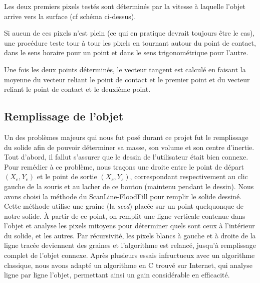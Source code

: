 Les deux premiers pixels testés sont déterminés par la vitesse à laquelle
l'objet arrive vers la surface (cf schéma ci-dessus).

Si aucun de ces pixels n'est plein (ce qui en pratique devrait toujours être le cas),
une procédure teste tour à tour les pixels en tournant autour du point de contact,
dans le sens horaire pour un point et dans le sens trigonométrique pour l'autre.

Une fois les deux points déterminés, le vecteur tangent est calculé en
faisant la moyenne du vecteur reliant le point de contact et le premier point
et du vecteur reliant le point de contact et le deuxième point.



\subsection{Remplissage de l'objet}
Un des problèmes majeurs qui nous fut posé durant ce projet fut le remplissage
du solide afin de pouvoir déterminer sa masse, son volume et son centre d'inertie.
Tout d'abord, il fallut s'assurer que le dessin de l'utilisateur était bien connexe.
Pour remédier à ce problème, nous traçons une droite entre le point de départ
$(X_e,Y_e)$ et le point de sortie $(X_s,Y_s)$, correspondant respectivement au clic
gauche de la souris et au lacher de ce bouton (maintenu pendant le dessin).
Nous avons choisi la méthode du ScanLine-FloodFill pour remplir le solide dessiné.
Cette méthode utilise une graine (la \emph{seed}) placée sur un point quelquonque
de notre solide. À partir de ce point, on remplit une ligne verticale contenue dans l'objet
et analyse les pixels mitoyens pour déterminer
quels sont ceux à l'intérieur du solide, et les autres. Par récursivité, les pixels
blancs à gauche et à droite de la ligne tracée deviennent des graines et l'algorithme
est relancé, jusqu'à remplissage complet de l'objet connexe.
Après plusieurs essais infructueux avec un algorithme classique, nous avons
adapté un algorithme en C trouvé sur Internet, qui analyse ligne par ligne l'objet,
permettant ainsi un gain considérable en efficacité. 
%

